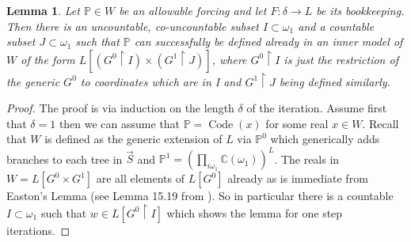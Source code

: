 \documentclass{article}
\theoremstyle{plain}
\newtheorem{lemma}[theorem]{Lemma}
\theoremstyle{definition}
\newcommand{\forceP}{\mathbb{P}}
\begin{document}
\begin{lemma}\label{Lemma:DefinabilityInInnerModels}
    Let $\forceP \in W$ be an allowable forcing and let $F: \delta \rightarrow L$ be its bookkeeping. Then there is an uncountable, co-uncountable subset $I \subset \omega_1$ and a countable subset $J \subset \omega_1$ such that
    $\forceP$ can successfully be defined already in an inner model of $W$ of the form
    $L[(G^0 \upharpoonright I)  \times (G^1 \upharpoonright J)]$, where $G^0 \upharpoonright I$ is just the restriction of the generic $G^0$ to coordinates which are in I and $G^1 \upharpoonright J$ being defined similarly.
\end{lemma}
\begin{proof}
    The proof is via induction on the length $\delta$ of the iteration.
    Assume first that $\delta=1$ then we can assume that $\forceP = \operatorname{Code} (x)$ for some real $x \in W$. Recall that $W$ is defined as the generic extension of $L$ via $\forceP^0$ which generically adds branches to each tree in $\vec{S}$ and $\forceP^1= (\prod_{i \omega_1} \mathbb{C} (\omega_1))^L$. The reals in $W= L[G^0 \times G^1]$ are all elements of $L[G^0]$ already as is immediate from Easton's Lemma (see Lemma 15.19 from \cite{Jech}). So in particular there is a countable $I \subset \omega_1$ such that $w \in L[G^0 \upharpoonright I]$ which shows the lemma for one step iterations.


\end{proof}
\end{document}
